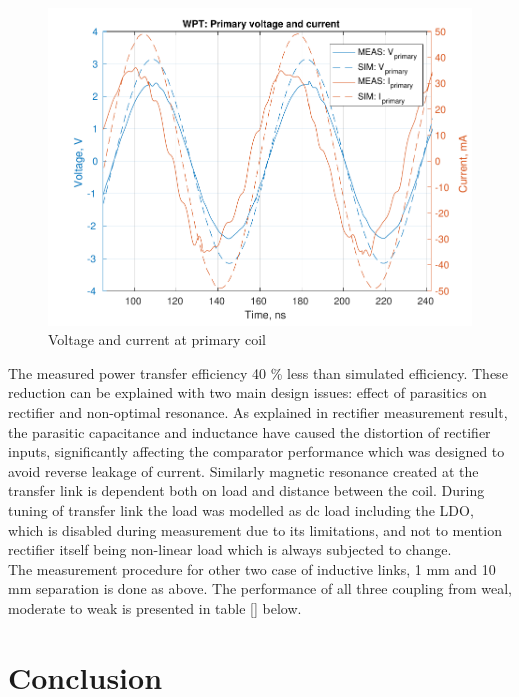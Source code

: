 \documentclass[UKenglish]{ifimaster}  %
\begin{document}
\begin{figure} [!htbp]
  \centering
  \includegraphics[width=\textwidth]{img/meas/wpt5_current_pri_2.pdf} 
 \caption{Voltage and current at primary coil} 
\label{fig:meas_wpt5_current_pri} 
\end{figure}

The measured power transfer efficiency 40 \% less than simulated efficiency. These reduction can be explained with two main design issues: effect of parasitics on rectifier and non-optimal resonance. As explained in rectifier measurement result, the parasitic capacitance and inductance have caused the distortion of rectifier inputs, significantly affecting the comparator performance which was designed to avoid reverse leakage of current. Similarly magnetic resonance created at the transfer link is dependent both on load and distance between the coil. During tuning of transfer link the load was modelled as dc load including the LDO, which is disabled during measurement due to its limitations, and not to mention rectifier itself being non-linear load which is always subjected to change. \\

The measurement procedure for other two case of inductive links, 1 mm and 10 mm separation is done as above. The performance of all three coupling from weal, moderate to weak is presented in table [] below. 

\part{Conclusion}
\end{document}
